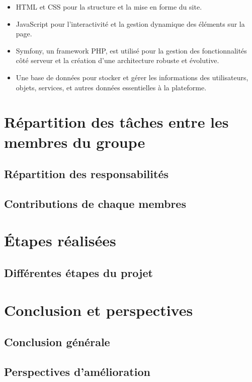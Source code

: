 \documentclass[a4paper,12pt]{report}
\begin{document}
	\begin{itemize}
		\item  HTML et CSS pour la structure et la mise en forme du site.
		\item JavaScript pour l'interactivité et la gestion dynamique des éléments sur la page.
		\item Symfony, un framework PHP, est utilisé pour la gestion des fonctionnalités côté serveur et la création d'une architecture robuste et évolutive.
		\item Une base de données pour stocker et gérer les informations des utilisateurs, objets, services, et autres données essentielles à la plateforme.
	\end{itemize}
	
	\newpage
	
	\section{Répartition des tâches entre les membres du groupe}
	
	\subsection{Répartition des responsabilités}
	
	\subsection{Contributions de chaque membres}
	
	\newpage
	
	\section{Étapes réalisées}
	
	\subsection{Différentes étapes du projet}
	
	\newpage
	
	\section{Conclusion et perspectives}
	
	\subsection{Conclusion générale}
	
	\subsection{Perspectives d'amélioration}

	
\end{document}

